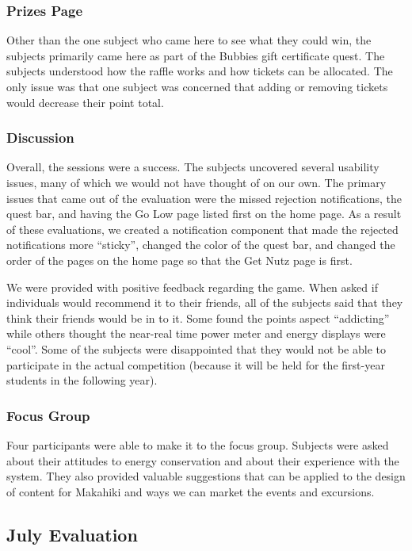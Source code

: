\subsubsection{Prizes Page}

Other than the one subject who came here to see what they could win, the subjects primarily came here as part of the Bubbies gift certificate quest. The subjects understood how the raffle works and how tickets can be allocated. The only issue was that one subject was concerned that adding or removing tickets would decrease their point total.

\subsubsection{Discussion}

Overall, the sessions were a success. The subjects uncovered several usability issues, many of which we would not have thought of on our own. The primary issues that came out of the evaluation were the missed rejection notifications, the quest bar, and having the Go Low page listed first on the home page. As a result of these evaluations, we created a notification component that made the rejected notifications more ``sticky'', changed the color of the quest bar, and changed the order of the pages on the home page so that the Get Nutz page is first.

We were provided with positive feedback regarding the game. When asked if individuals would recommend it to their friends, all of the subjects said that they think their friends would be in to it. Some found the points aspect ``addicting'' while others thought the near-real time power meter and energy displays were ``cool''. Some of the subjects were disappointed that they would not be able to participate in the actual competition (because it will be held for the first-year students in the following year).

\subsubsection{Focus Group}

Four participants were able to make it to the focus group. Subjects were asked about their attitudes to energy conservation and about their experience with the system. They also provided valuable suggestions that can be applied to the design of content for Makahiki and ways we can market the events and excursions.

\subsection{July Evaluation}

